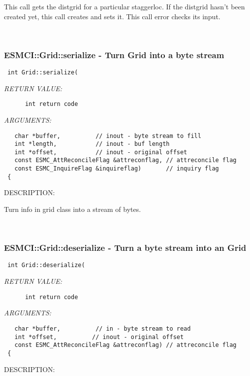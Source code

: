   This call gets the distgrid for a particular staggerloc. If the distgrid hasn't 
   been created yet, this call creates and sets it. This call error checks its input.
   
 
\mbox{}\hrulefill\
 
\subsubsection [ESMCI::Grid::serialize] {ESMCI::Grid::serialize - Turn Grid into a byte stream}


  
\begin{verbatim} int Grid::serialize(\end{verbatim}{\em RETURN VALUE:}
\begin{verbatim}      int return code\end{verbatim}{\em ARGUMENTS:}
\begin{verbatim}   char *buffer,          // inout - byte stream to fill
   int *length,           // inout - buf length
   int *offset,           // inout - original offset
   const ESMC_AttReconcileFlag &attreconflag, // attreconcile flag
   const ESMC_InquireFlag &inquireflag)       // inquiry flag
 {
                          \end{verbatim}
{\sf DESCRIPTION:\\ }


      Turn info in grid class into a stream of bytes.
   
 
\mbox{}\hrulefill\
 
\subsubsection [ESMCI::Grid::deserialize] {ESMCI::Grid::deserialize - Turn a byte stream into an Grid}


  
\begin{verbatim} int Grid::deserialize(\end{verbatim}{\em RETURN VALUE:}
\begin{verbatim}      int return code\end{verbatim}{\em ARGUMENTS:}
\begin{verbatim}   char *buffer,          // in - byte stream to read
   int *offset,          // inout - original offset 
   const ESMC_AttReconcileFlag &attreconflag) // attreconcile flag
 {\end{verbatim}
{\sf DESCRIPTION:\\ }


